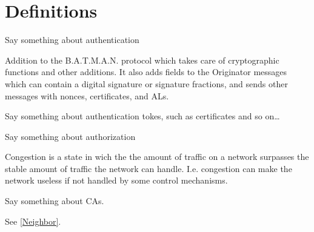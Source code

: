 \chapter*{Definitions}


\begin{acronym}



	Say something about authentication

	Addition to the B.A.T.M.A.N. protocol which takes care of cryptographic
	functions and other additions. It also adds fields to the Originator messages
	which can contain a digital signature or signature fractions, and sends other
	messages with nonces, certificates, and ALs.

	Say something about authentication tokes, such as certificates and so on\ldots

	Say something about authorization

	Congestion is a state in wich the the amount of traffic on a network surpasses
	the stable amount of traffic the network can handle. I.e. congestion can make
	the network useless if not handled by some control mechanisms.
	
	Say something about CAs.



	See \ref{Neighbor}.



\end{acronym}
